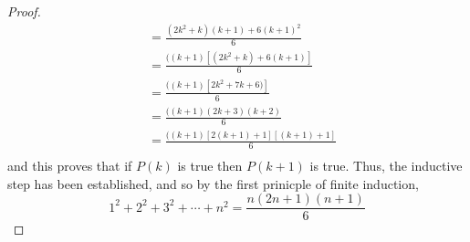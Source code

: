 \begin{example}
\begin{proof}
\begin{align*}
                    & = \frac{(2k^2 + k)(k+1) + 6(k+1)^2}{6} \\
                    & = \frac{((k+1)[(2k^2 + k) + 6(k+1)]}{6} \\
                    & = \frac{((k+1)[2k^2 + 7k + 6)]}{6} \\
                    & = \frac{((k+1)(2k+3)(k+2)}{6} \\
                    & = \frac{((k+1)[2(k+1) + 1][(k + 1) + 1]}{6} \\    
            \end{align*}
        and this proves that if $P(k)$ is true then $P(k+1)$ is true. Thus, the inductive step has been established, and so by the first prinicple of finite induction,
            \begin{equation*}
                1^2 + 2^2 + 3^2 + \cdots + n^2 = \frac{n(2n+1)(n+1)}{6}
            \end{equation*}
    \end{proof}
\end{example}



